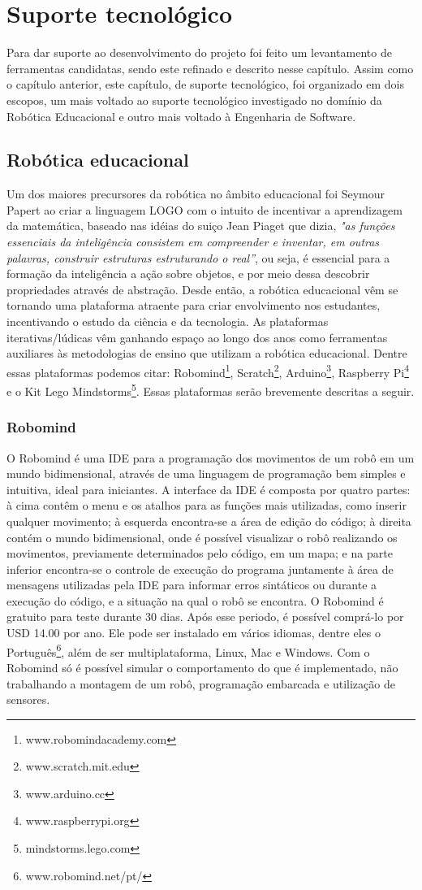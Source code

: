 \chapter{Suporte tecnológico}
Para dar suporte ao desenvolvimento do projeto foi feito um levantamento de ferramentas candidatas, sendo este refinado e descrito nesse capítulo. Assim como o capítulo anterior, este capítulo, de suporte tecnológico, foi organizado em dois escopos, um mais voltado ao suporte tecnológico investigado no domínio da Robótica Educacional e outro mais voltado à Engenharia de Software.

\section{Robótica educacional}
Um dos maiores precursores da robótica no âmbito educacional foi Seymour Papert ao criar a  linguagem LOGO com o intuito de incentivar a aprendizagem da matemática, baseado nas idéias do suiço Jean Piaget que dizia, \textit{"as funções essenciais da inteligência consistem em compreender e inventar, em outras palavras, construir estruturas estruturando o real”}, ou seja, é essencial para a formação da inteligência a ação sobre objetos, e por meio dessa descobrir propriedades através de abstração.
Desde então, a robótica educacional vêm se tornando uma plataforma atraente para criar envolvimento nos estudantes, incentivando o estudo da ciência e da tecnologia. 
As plataformas iterativas/lúdicas vêm ganhando espaço ao longo dos anos como ferramentas auxiliares às metodologias de ensino que utilizam a robótica educacional. Dentre essas plataformas podemos citar: Robomind\footnote{www.robomindacademy.com}, Scratch\footnote{www.scratch.mit.edu}, Arduino\footnote{www.arduino.cc}, Raspberry Pi\footnote{www.raspberrypi.org} e o Kit Lego Mindstorms\footnote{mindstorms.lego.com}. Essas plataformas serão brevemente descritas a seguir.

\subsection{Robomind}
O Robomind é uma IDE para a programação dos movimentos de um robô em um mundo bidimensional, através de uma linguagem de programação bem simples e intuitiva, ideal para iniciantes. 
A interface da IDE é composta por quatro partes: à cima contêm o menu e os atalhos para as funções mais utilizadas, como inserir qualquer movimento; à esquerda encontra-se a área de  edição do código; à direita contém o mundo bidimensional, onde é possível visualizar o robô realizando os movimentos, previamente determinados pelo código, em um mapa; e na parte inferior encontra-se o controle de execução do programa juntamente à área de mensagens utilizadas pela IDE para informar erros sintáticos ou durante a execução do código, e a situação na qual o robô se encontra. 
O Robomind é gratuito para teste durante 30 dias. Após esse periodo, é possível comprá-lo por USD 14.00 por ano. Ele pode ser instalado em vários idiomas, dentre eles o Português\footnote{www.robomind.net/pt/}, além de ser multiplataforma, Linux, Mac e Windows. 
Com o Robomind só é possível simular o comportamento do que é implementado, não trabalhando a montagem de um robô, programação embarcada e utilização de sensores.

